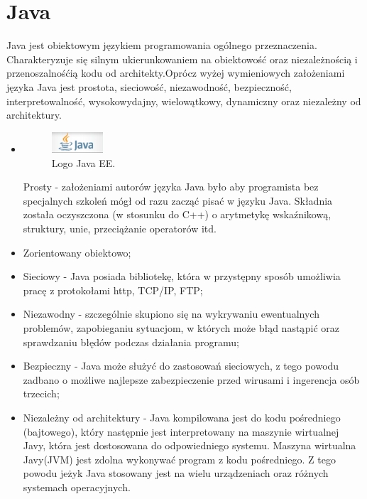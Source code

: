 \documentclass[eng,printmode,oneside]{mgr}
\begin{document}
\section{Java}

Java jest obiektowym językiem programowania ogólnego przeznaczenia.
Charakteryzuje się silnym ukierunkowaniem na obiektowość oraz niezależnością i
przenoszalnośćią kodu od architekty.Oprócz wyżej wymieniowych założeniami języka
Java jest prostota, sieciowość, niezawodność, bezpieczność, interpretowalność, wysokowydajny,
wielowątkowy, dynamiczny oraz niezależny od architektury. 

\begin{itemize}
  \item  \parbox[t]{\dimexpr\textwidth-\leftmargin}{
      \vspace{-2.5mm}
    \begin{figure}
	\centering
	\includegraphics[width=0.18\textwidth]{javaEE.png}
	\caption{\label{javaEE}Logo Java EE.}
	\end{figure}
  Prosty - założeniami autorów języka Java było aby programista bez
  specjalnych szkoleń mógł od razu zacząć pisać w języku Java. Składnia została
  oczyszczona (w stosunku do C++) o arytmetykę wskaźnikową, struktury, unie,
  przeciążanie operatorów itd. 
	}
  \item Zorientowany obiektowo;
  \item Sieciowy - Java posiada bibliotekę, która w przystępny sposób umożliwia
  pracę z protokołami http, TCP/IP, FTP;
  \item Niezawodny - szczególnie skupiono się na wykrywaniu ewentualnych
  problemów, zapobieganiu sytuacjom, w których może błąd nastąpić oraz
  sprawdzaniu błędów podczas działania programu;
  \item Bezpieczny - Java może służyć do zastosowań sieciowych, z tego powodu
  zadbano o możliwe najlepsze zabezpieczenie przed wirusami i ingerencja osób
  trzecich;
  \item Niezależny od architektury - Java kompilowana jest do kodu pośredniego
  (bajtowego), który następnie jest interpretowany na maszynie wirtualnej Javy,
  która jest dostosowana do odpowiedniego systemu. Maszyna wirtualna Javy(JVM)
  jest zdolna wykonywać program z kodu pośredniego. Z tego powodu jeżyk Java
  stosowany jest na wielu urządzeniach oraz różnych systemach operacyjnych.

\end{itemize}
\end{document}
